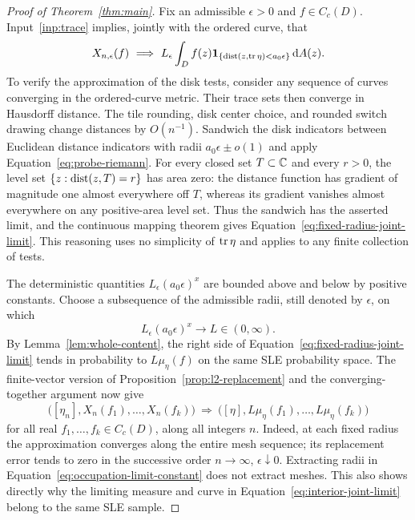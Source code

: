 \begin{proof}[Proof of Theorem~\ref{thm:main}]
Fix an admissible $\epsilon>0$ and $f\in C_c(D)$.  Input~\ref{inp:trace}
implies, jointly with the ordered curve, that
\begin{equation}
 X_{n,\epsilon}(f)\ \Longrightarrow\
 L_\epsilon\int_D f(z)
       \1_{\{\dist(z,\tr\eta)<a_0\epsilon\}}\dd A(z).
 \label{eq:fixed-radius-joint-limit}
\end{equation}
To verify the approximation of the disk tests, consider any sequence
of curves converging in the ordered-curve metric.  Their trace sets
then converge in Hausdorff distance.  The tile
rounding, disk center choice, and rounded switch drawing change
distances by $O(n^{-1})$.  Sandwich the disk indicators between
Euclidean distance indicators with radii
$a_0\epsilon\pm o(1)$ and apply
Equation~\eqref{eq:probe-riemann}.
For every closed set $T\subset\mathbb C$ and every $r>0$, the level set
$\{z:\operatorname{dist}(z,T)=r\}$ has area zero: the distance function has gradient
of magnitude one almost everywhere off $T$, whereas its gradient
vanishes almost everywhere on any positive-area level set.
Thus the sandwich has the asserted limit, and the continuous mapping
theorem gives Equation~\eqref{eq:fixed-radius-joint-limit}.
This reasoning uses no simplicity of $\operatorname{tr}\eta$ and applies to any
finite collection of tests.

The deterministic quantities $L_\epsilon(a_0\epsilon)^x$ are bounded
above and below by positive constants.  Choose a subsequence of the
admissible radii, still denoted by $\epsilon$, on which
\begin{equation}
 L_\epsilon(a_0\epsilon)^x\longrightarrow L\in(0,\infty).
 \label{eq:occupation-limit-constant}
\end{equation}
By Lemma~\ref{lem:whole-content}, the right side of
Equation~\eqref{eq:fixed-radius-joint-limit} tends in probability to
$L\mu_\eta(f)$ on the same SLE probability space.  The finite-vector
version of Proposition~\ref{prop:l2-replacement} and the
converging-together argument now give
\begin{equation}
 \bigl([\eta_n],X_n(f_1),\ldots,X_n(f_k)\bigr)
 \ \Longrightarrow\
 \bigl([\eta],L\mu_\eta(f_1),\ldots,L\mu_\eta(f_k)\bigr)
 \label{eq:interior-joint-limit}
\end{equation}
for all real $f_1,\ldots,f_k\in C_c(D)$, along all integers $n$.
Indeed, at each fixed radius the approximation converges along the
entire mesh sequence; its replacement error tends to zero in the
successive order $n\to\infty$, $\epsilon\downarrow0$.
Extracting radii in Equation~\eqref{eq:occupation-limit-constant}
does not extract meshes.  This also shows directly why the limiting
measure and curve in Equation~\eqref{eq:interior-joint-limit} belong
to the same SLE sample.


\end{proof}
